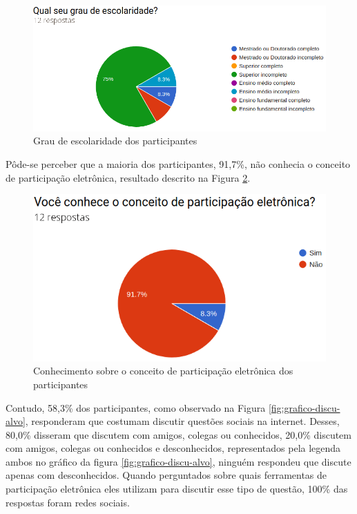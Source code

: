 \begin{figure}[!ht]
    \centering
    \includegraphics[scale=0.4]{./figuras/grau_escolaridade.png}
    \caption{Grau de escolaridade dos participantes}
    \label{fig:grafico-grau}
\end{figure}

\par
Pôde-se perceber que a maioria dos participantes, 91,7\%, não conhecia o conceito de participação eletrônica, resultado descrito na Figura \ref{fig:grafico-participacao}.

\begin{figure}[!ht]
    \centering
    \includegraphics[scale=0.4]{./figuras/conhece_participacao_eletronica.png}
    \caption{Conhecimento sobre o conceito de participação eletrônica dos participantes}
    \label{fig:grafico-participacao}
\end{figure}

\par
Contudo, 58,3\% dos participantes, como observado na Figura \ref{fig:grafico-discu-alvo}, responderam que costumam discutir questões sociais na internet. 
Desses, 80,0\% disseram que  discutem com amigos, colegas ou conhecidos, 20,0\% discutem com amigos, colegas ou conhecidos e desconhecidos, representados pela legenda ambos
no gráfico da figura \ref{fig:grafico-discu-alvo}, ninguém respondeu que discute apenas com desconhecidos. Quando perguntados sobre quais ferramentas de participação 
eletrônica eles utilizam para discutir esse tipo de questão, 100\% das respostas foram redes sociais. 

